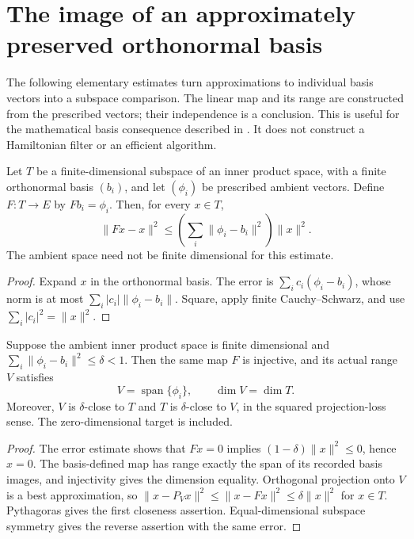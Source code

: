 \section{The image of an approximately preserved orthonormal basis}

The following elementary estimates turn approximations to individual basis
vectors into a subspace comparison. The linear map and its range are
constructed from the prescribed vectors; their independence is a conclusion.
This is useful for the mathematical basis consequence described in
\cite[line 288 and Theorem~thm:al-ld, lines 1096--1105]{Arad2016RigorousRG}.
It does not construct a Hamiltonian filter or an efficient algorithm.

\begin{lemma}
    \label{lem:approximate_basis_map_error}
    \leanok
    Let $T$ be a finite-dimensional subspace of an inner product space,
    with a finite orthonormal basis $(b_i)$, and let $(\phi_i)$ be
    prescribed ambient vectors. Define $F:T\to E$ by $Fb_i=\phi_i$.
    Then, for every $x\in T$,
    \[
        \|Fx-x\|^2\le
        \left(\sum_i\|\phi_i-b_i\|^2\right)\|x\|^2.
    \]
    The ambient space need not be finite dimensional for this estimate.
\end{lemma}
\begin{proof}\leanok
    Expand $x$ in the orthonormal basis. The error is
    $\sum_i c_i(\phi_i-b_i)$, whose norm is at most
    $\sum_i|c_i|\|\phi_i-b_i\|$. Square, apply finite
    Cauchy--Schwarz, and use $\sum_i|c_i|^2=\|x\|^2$.
\end{proof}

\begin{lemma}
    \label{lem:approximate_basis_image_close}
    \leanok
    Suppose the ambient inner product space is finite dimensional and
    $\sum_i\|\phi_i-b_i\|^2\le\delta<1$.
    Then the same map $F$ is injective, and its actual range $V$ satisfies
    \[
        V=\operatorname{span}\{\phi_i\},\qquad
        \dim V=\dim T.
    \]
    Moreover, $V$ is $\delta$-close to $T$ and $T$ is
    $\delta$-close to $V$, in the squared projection-loss sense.
    The zero-dimensional target is included.
\end{lemma}
\begin{proof}\leanok
    The error estimate shows that $Fx=0$ implies
    $(1-\delta)\|x\|^2\le0$, hence $x=0$.
    The basis-defined map has range exactly the span of its recorded
    basis images, and injectivity gives the dimension equality.
    Orthogonal projection onto $V$ is a best approximation, so
    $\|x-P_Vx\|^2\le\|x-Fx\|^2\le\delta\|x\|^2$ for $x\in T$.
    Pythagoras gives the first closeness assertion. Equal-dimensional
    subspace symmetry gives the reverse assertion with the same error.
\end{proof}
